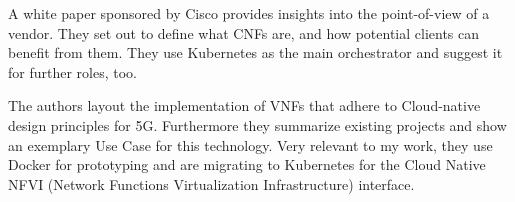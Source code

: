 \begin{description}[style=sameline, leftmargin=1em, font=\normalfont]
	\item [CNF White Paper by Cisco \cite{CNF}] A white paper sponsored by Cisco provides insights into the point-of-view of a vendor. They set out to define what CNFs are, and how potential clients can benefit from them. They use Kubernetes as the main orchestrator and suggest it for further roles, too. 
	
	\item [Cloud-native 5G \cite{inproceedings}] The authors layout the implementation of VNFs that adhere to Cloud-native design principles for 5G. Furthermore they summarize existing projects and show an exemplary Use Case for this technology. Very relevant to my work, they use Docker for prototyping and are migrating to Kubernetes for the Cloud Native NFVI (Network Functions Virtualization Infrastructure) interface. 
	
	
\end{description}